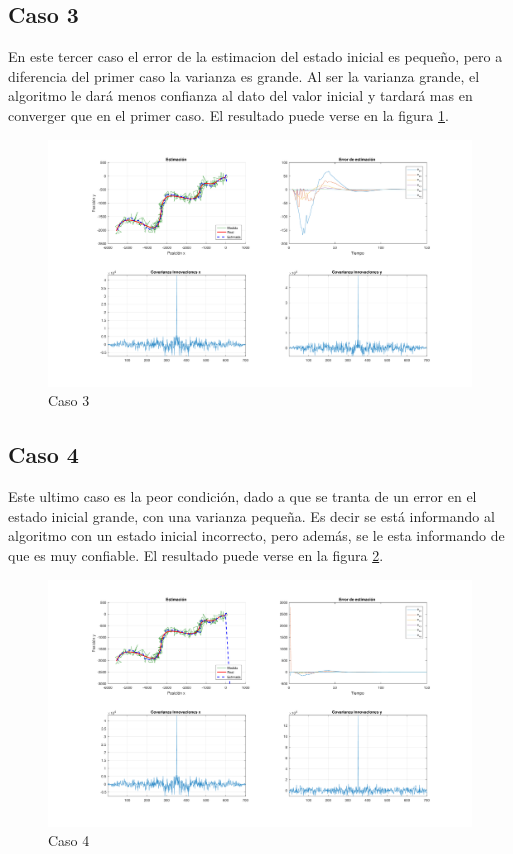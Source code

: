 	\subsection{Caso 3}
	
	En este tercer caso el error de la estimacion del estado inicial es pequeño, pero a diferencia del primer caso la varianza es grande. Al ser la varianza grande, el algoritmo le dará menos confianza al dato del valor inicial y tardará mas en converger que en el primer caso. El resultado puede verse en la figura \ref{fig:ej3c}.
	
		\begin{figure}[H]
			\centering
			\includegraphics[width=1.0\textwidth,keepaspectratio]{Figuras/graf_ej3c.pdf}
			\caption{Caso 3}
			\label{fig:ej3c}
		\end{figure}
	
	\subsection{Caso 4}
	
	Este ultimo caso es la peor condición, dado a que se tranta de un error en el estado inicial grande, con una varianza pequeña. Es decir  se está informando al algoritmo con un estado inicial incorrecto, pero además, se le esta informando de que es muy confiable. El resultado puede verse en la figura \ref{fig:ej3d}.
	
		\begin{figure}[H]
			\centering
			\includegraphics[width=1.0\textwidth,keepaspectratio]{Figuras/graf_ej3d.pdf}
			\caption{Caso 4}
			\label{fig:ej3d}
		\end{figure}
	
